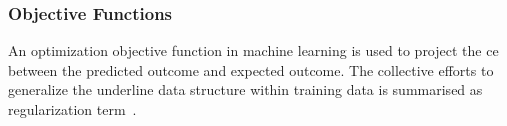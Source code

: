 \subsubsection{Objective Functions}
An optimization objective function in machine learning is used to project the ce between the predicted outcome and expected outcome. The collective efforts to generalize the underline data structure within training data is summarised as regularization term~\cite{goodfellow_2015}.  